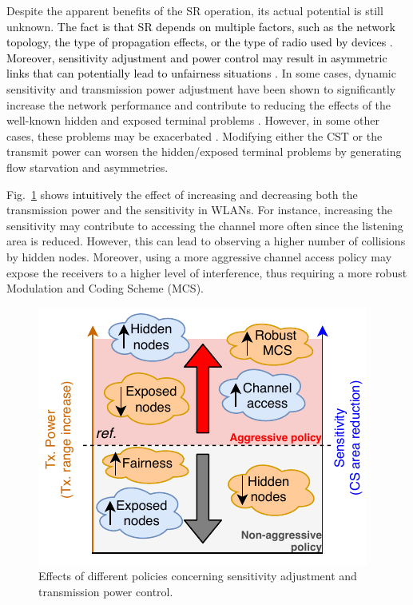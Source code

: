 \documentclass[preprint,12pt]{elsarticle}
\begin{document}
Despite the apparent benefits of the SR operation, its actual potential is still unknown. \textcolor{black}{The fact is that SR depends on multiple factors, such as the network topology, the type of propagation effects, or the type of radio used by devices \cite{guo2003spatial, zhu2004adapting}. Moreover, sensitivity adjustment and power control may result in asymmetric links that can potentially lead to unfairness situations \cite{mhatre2007interference}.} In some cases, dynamic sensitivity and transmission power adjustment have been shown to significantly increase the network performance and contribute to reducing the effects of the well-known hidden and exposed terminal problems \cite{zhou2005balancing}. However, in some other cases, these problems may be exacerbated \cite{wilhelmi2019potential}. Modifying either the CST or the transmit power can worsen the hidden/exposed terminal problems by generating flow starvation and asymmetries.

Fig.~\ref{fig:policies_sr} shows \textcolor{black}{intuitively} the effect of increasing and decreasing both the transmission power and the sensitivity in WLANs. For instance, increasing the sensitivity may contribute to accessing the channel more often since the listening area is reduced. However, this can lead to observing a higher number of collisions by hidden nodes. Moreover, using a more aggressive channel access policy may expose the receivers to a higher level of interference, thus requiring a more robust Modulation and Coding Scheme (MCS).
\begin{figure}[ht!]
	\centering
	\includegraphics[width=0.4\columnwidth]{policies_sr}
	\caption{Effects of different policies concerning sensitivity adjustment and transmission power control.}
	\label{fig:policies_sr}
\end{figure}
\end{document}
